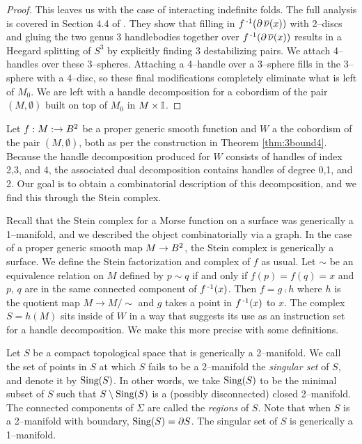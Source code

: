 \begin{proof}
	This leaves us with the case of interacting indefinite folds.
	The full analysis is covered in Section 4.4 of \cite{CostThur08}.
	They show that filling in $f^{\,\text{-}1}(\partial\,\overline{\nu}(x))$ with 2--discs and gluing the two genus 3 handlebodies together over $f^{\,\text{-}1}(\partial\,\overline{\nu}(x))$ results in a Heegard splitting of $S^3$ by explicitly finding 3 destabilizing pairs.
	We attach 4--handles over these 3--spheres.
	Attaching a 4--handle over a 3--sphere fills in the 3--sphere with a 4--disc, so these final modifications completely eliminate what is left of $M_0$.
	We are left with a handle decomposition for a cobordism of the pair $(M,\emptyset)$ built on top of $M_0$ in $M\times\mathbb{I}$.
\end{proof}

Let $f:M:\to B^2$ be a proper generic smooth function and $W$ a the cobordism of the pair $(M,\emptyset)$, both as per the construction in Theorem \ref{thm:3bound4}. 
Because the handle decomposition produced for $W$ consists of handles of index 2,3, and 4, the associated dual decomposition contains handles of degree 0,1, and 2.
Our goal is to obtain a combinatorial description of this decomposition, and we find this through the Stein complex.

Recall that the Stein complex for a Morse function on a surface was generically a 1--manifold, and we described the object combinatorially via a graph.
In the case of a proper generic smooth map $M\to B^2$, the Stein complex is generically a surface.
We define the Stein factorization and complex of $f$ as usual.
Let $\sim$ be an equivalence relation on $M$ defined by $p\sim q$ if and only if $f(p)=f(q)=x$ and $p$, $q$ are in the same connected component of $f^{\,\text{-}1}(x)$.
Then $f=g\comp h$ where $h$ is the quotient map $M\to M/\!\!\sim$ and $g$ takes a point in $f^{\,\text{-}1}(x)$ to $x$.
The complex $S=h(M)$ sits inside of $W$ in a way that suggests its use as an instruction set for a handle decomposition.
We make this more precise with some definitions.

\begin{defn}
	Let $S$ be a compact topological space that is generically a 2--manifold.
	We call the set of points in $S$ at which $S$ fails to be a 2--manifold the \emph{singular set} of $S$, and denote it by $\textrm{Sing}(S)$.
	In other words, we take $\textrm{Sing}(S)$ to be the minimal subset of $S$ such that $S\setminus\textrm{Sing}(S)$ is a (possibly disconnected) closed 2--manifold.
	The connected components of $\Sigma$ are called the \emph{regions} of $S$.
	Note that when $S$ is a 2--manifold with boundary, $\textrm{Sing}(S)=\partial S$.
	The singular set of $S$ is generically a 1--manifold.
\end{defn}


